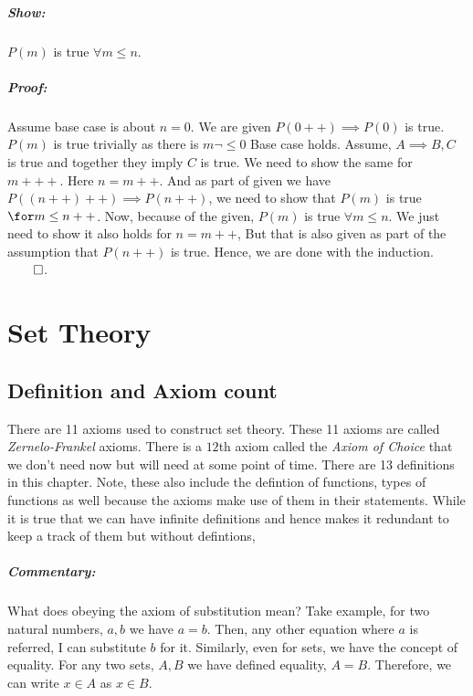 \documentclass{report}
\begin{document}
\paragraph{Show: } $P(m)$ is true $\forall m \le n$.
\paragraph{Proof:} Assume base case is about $n=0$. We are given $P(0++) \implies P(0)$ is true. $P(m)$ is true trivially as there is  $m \neg \le0$ Base case holds. Assume,  $A \implies B, C$ is true and together they imply  $C$ is true. We need to show the same for $m+++$. Here $n=m++$. And as part of given we have  $P((n++)++) \implies P(n++)$, we need to show that  $P(m)$ is true $\for m \le n++$. Now, because of the given, $P(m)$ is true  $\forall m \le n$. We just need to show it also holds for  $n=m++$, But that is also given as part of the assumption that  $P(n++)$ is true. Hence, we are done with the induction. $\qed$. 







\chapter{Set Theory}
\section*{Definition and Axiom count}
There are 11 axioms used to construct set theory. These 11 axioms are called \textit{Zernelo-Frankel} axioms. There is a $12$th axiom called the \textit{Axiom of Choice}  that we don't need now but will need at some point of time.  There are 13 definitions in this chapter. Note, these also include the defintion of functions, types of functions as well because the axioms make use of them in their statements.
 While it is true that we can have infinite definitions and hence makes it redundant to keep a track of them but without defintions, 
\paragraph{Commentary: }What does obeying the axiom of substitution mean? Take example, for two natural numbers, $a,b$ we have $a=b$. Then, any other equation where $a$ is referred, I can substitute $b$ for it. Similarly, even for sets, we have the concept of equality. For any two sets,  $A,B$ we have defined equality, $A=B$. Therefore, we can write $x \in A$ as  $x \in B$. 
\end{document}
